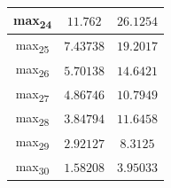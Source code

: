 \documentclass[12pt]{article}
\begin{document}
\begin{table}
\begin{tabular}{||c c c||}
			\hline
			max\textsubscript{24} & $11.762$ & $26.1254$ \\
			\hline
			max\textsubscript{25} & $7.43738$ & $19.2017$ \\
			\hline
			max\textsubscript{26} & $5.70138$ & $14.6421$ \\
			\hline
			max\textsubscript{27} & $4.86746$ & $10.7949$ \\
			\hline
			max\textsubscript{28} & $3.84794$ & $11.6458$ \\
			\hline
			max\textsubscript{29} & $2.92127$ & $8.3125$ \\
			\hline
			max\textsubscript{30} & $1.58208$ & $3.95033$ \\
			\hline
		\end{tabular}
	\label{Tab:Features_4_3}
\end{table}
\end{document}
